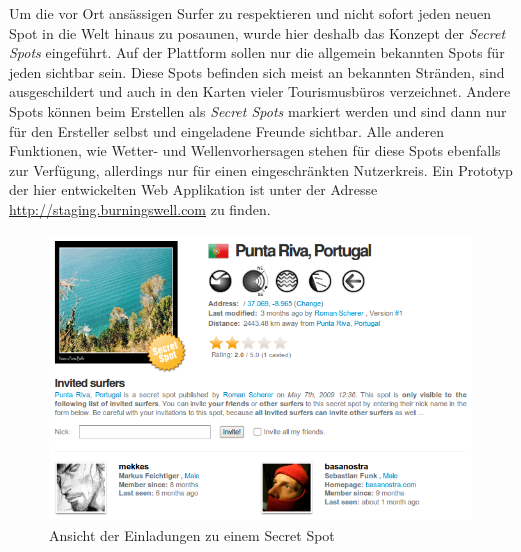 Um die vor Ort ansässigen Surfer zu respektieren und nicht sofort
jeden neuen Spot in die Welt hinaus zu posaunen, wurde hier deshalb
das Konzept der \textit{Secret Spots} eingeführt. Auf der Plattform
sollen nur die allgemein bekannten Spots für jeden sichtbar
sein. Diese Spots befinden sich meist an bekannten Stränden, sind
ausgeschildert und auch in den Karten vieler Tourismusbüros
verzeichnet. Andere Spots können beim Erstellen als \textit{Secret
  Spots} markiert werden und sind dann nur für den Ersteller selbst
und eingeladene Freunde sichtbar. Alle anderen Funktionen, wie Wetter-
und Wellenvorhersagen stehen für diese Spots ebenfalls zur Verfügung,
allerdings nur für einen eingeschränkten Nutzerkreis. Ein Prototyp der
hier entwickelten Web Applikation ist unter der Adresse
\url{http://staging.burningswell.com} zu finden.

\begin{figure}[t]
 \includegraphics[width=\textwidth]{bilder/secret-spot}
 \caption{Ansicht der Einladungen zu einem Secret Spot}
 \label{secret-spot}
\end{figure}

